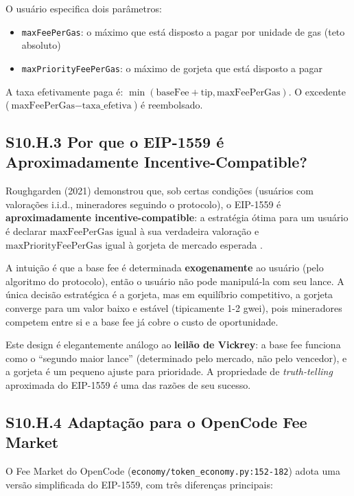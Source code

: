 O usuário especifica dois parâmetros:
\begin{itemize}
    \item \texttt{maxFeePerGas}: o máximo que está disposto a pagar por unidade de gas (teto absoluto)
    \item \texttt{maxPriorityFeePerGas}: o máximo de gorjeta que está disposto a pagar
\end{itemize}

A taxa efetivamente paga é: $\min(\text{baseFee} + \text{tip}, \text{maxFeePerGas})$. O excedente ($\text{maxFeePerGas} - \text{taxa\_efetiva}$) é reembolsado.

\subsection*{S10.H.3 Por que o EIP-1559 é Aproximadamente Incentive-Compatible?}

Roughgarden (2021) demonstrou que, sob certas condições (usuários com valorações i.i.d., mineradores seguindo o protocolo), o EIP-1559 é \textbf{aproximadamente incentive-compatible}: a estratégia ótima para um usuário é declarar $\text{maxFeePerGas}$ igual à sua verdadeira valoração e $\text{maxPriorityFeePerGas}$ igual à gorjeta de mercado esperada \cite{roughgarden2021transaction}.

A intuição é que a base fee é determinada \textbf{exogenamente} ao usuário (pelo algoritmo do protocolo), então o usuário não pode manipulá-la com seu lance. A única decisão estratégica é a gorjeta, mas em equilíbrio competitivo, a gorjeta converge para um valor baixo e estável (tipicamente 1-2 gwei), pois mineradores competem entre si e a base fee já cobre o custo de oportunidade.

Este design é elegantemente análogo ao \textbf{leilão de Vickrey}: a base fee funciona como o ``segundo maior lance'' (determinado pelo mercado, não pelo vencedor), e a gorjeta é um pequeno ajuste para prioridade. A propriedade de \textit{truth-telling} aproximada do EIP-1559 é uma das razões de seu sucesso.

\subsection*{S10.H.4 Adaptação para o OpenCode Fee Market}

O Fee Market do OpenCode (\texttt{economy/token\_economy.py:152-182}) adota uma versão simplificada do EIP-1559, com três diferenças principais:


